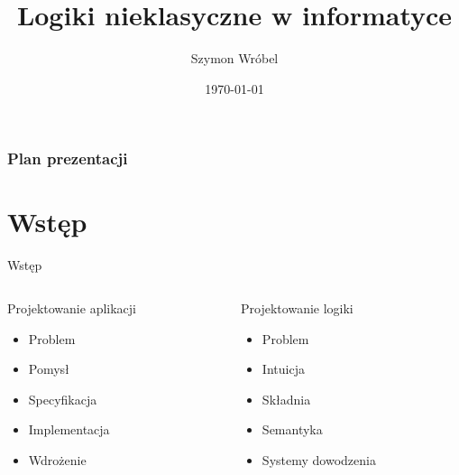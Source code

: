 \documentclass{beamer}
\title[Logiki nieklasyczne]{Logiki nieklasyczne w informatyce}
\author{Szymon Wróbel}
\date{\today}
\begin{document}
\begin{frame}
\titlepage
\end{frame}

\begin{frame}
\frametitle{Plan prezentacji}
\tableofcontents
\end{frame}


\section{Wstęp}
\begin{frame}{Wstęp}
  \begin{columns}
    \begin{column}{0.5\textwidth}
      Projektowanie aplikacji

      \begin{itemize}[<+->]
        \item Problem
        \item Pomysł
        \item Specyfikacja
        \item Implementacja
        \item Wdrożenie
      \end{itemize}
    \end{column}

    \pause

    \begin{column}{0.5\textwidth}
      Projektowanie logiki
      \begin{itemize}[<+->]
        \item Problem
        \item Intuicja
        \item Składnia
        \item Semantyka
        \item Systemy dowodzenia
      \end{itemize}
    \end{column}
  \end{columns}
\end{frame}
\end{document}
